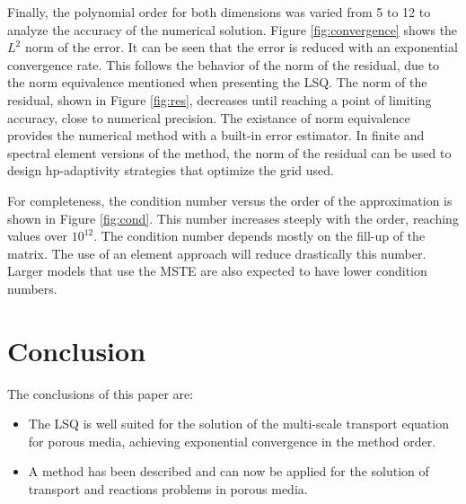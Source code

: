 \documentclass{CFD2011}
\newcommand{\TODO}[1]{\textcolor{blue}{TODO: #1} \\}
\newcommand{\newf}[1]{#1}
\newcommand{\nof}[1]{\textcolor{cyan}{}}
\begin{document}



Finally, the polynomial order for both dimensions was varied from 5 to 12 to analyze the accuracy of the numerical solution. Figure \ref{fig:convergence} shows the $L^2$ norm of the error. It can be seen that the error is reduced with an exponential convergence rate. This follows the behavior of the norm of the residual, due to the norm equivalence mentioned when presenting the LSQ. The norm of the residual, shown in Figure \ref{fig:res}, decreases until reaching a point of limiting accuracy, close to numerical precision. The existance of norm equivalence provides the numerical method with a built-in error estimator. In finite and spectral element versions of the method, the norm of the residual can be used to design hp-adaptivity strategies that optimize the grid used.



For completeness, the condition number versus the order of the approximation is shown in Figure \ref{fig:cond}. This number increases steeply with the order, reaching values over $10^{12}$. The condition number depends mostly on the fill-up of the matrix. The use of an element approach will reduce drastically this number. Larger models that use the MSTE are also expected to have lower condition numbers.


\section{Conclusion}

The conclusions of this paper are:

\begin{itemize}
\item The \nof{least square high order method}\newf{LSQ} is well suited for the solution of the multi-scale transport equation for porous media\newf{,} achieving exponential convergence in the method order.
\item A method has been described and can now be applied for the solution of transport and reactions problems in porous media.
\end{itemize}
\end{document}
